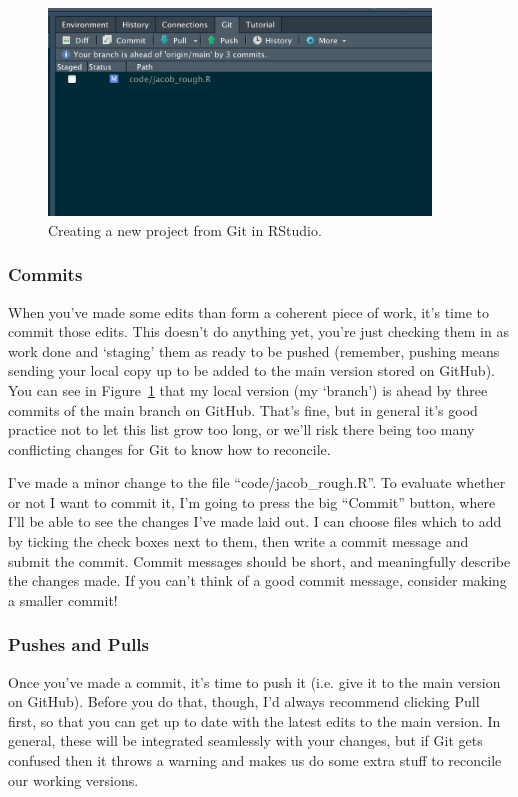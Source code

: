 \documentclass[12pt]{article}
\begin{document}
\begin{figure}[htbp]
    \centering
    \includegraphics[width=4in]{figures/rstudio_git_panel.png}
    \caption{Creating a new project from Git in RStudio.}
    \label{fig:rstudio_git_panel}
\end{figure}

\subsubsection{Commits}
When you've made some edits than form a coherent piece of work, it's time to commit those edits. This doesn't do anything yet, you're just checking them in as work done and `staging' them as ready to be pushed (remember, pushing means sending your local copy up to be added to the main version stored on GitHub). You can see in Figure~\ref{fig:rstudio_git_panel} that my local version (my `branch') is ahead by three commits of the main branch on GitHub. That's fine, but in general it's good practice not to let this list grow too long, or we'll risk there being too many conflicting changes for Git to know how to reconcile. 

I've made a minor change to the file ``code/jacob\_rough.R''. To evaluate whether or not I want to commit it, I'm going to press the big ``Commit'' button, where I'll be able to see the changes I've made laid out. I can choose files which to add by ticking the check boxes next to them, then write a commit message and submit the commit. Commit messages should be short, and meaningfully describe the changes made. If you can't think of a good commit message, consider making a smaller commit!

\subsubsection{Pushes and Pulls}
Once you've made a commit, it's time to push it (i.e. give it to the main version on GitHub). Before you do that, though, I'd always recommend clicking Pull first, so that you can get up to date with the latest edits to the main version. In general, these will be integrated seamlessly with your changes, but if Git gets confused then it throws a warning and makes us do some extra stuff to reconcile our working versions.
\end{document}
